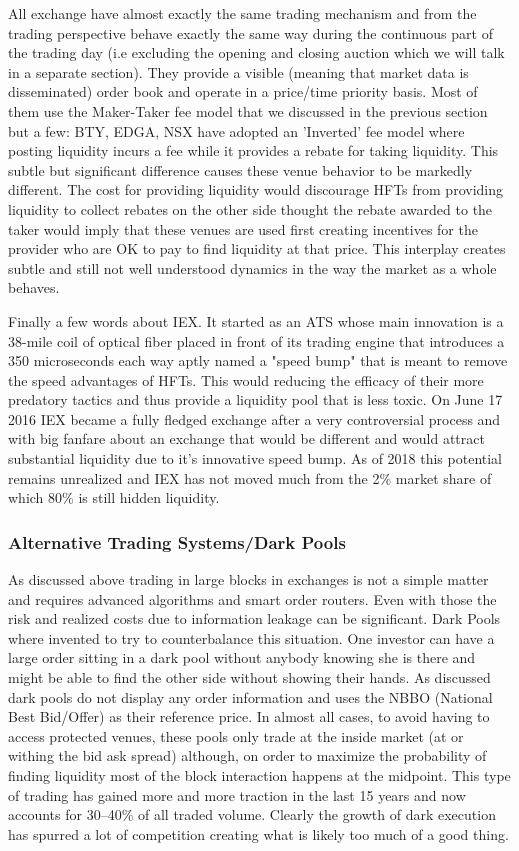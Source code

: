 All exchange have almost exactly the same trading mechanism and from the trading perspective behave exactly the same way during the continuous part of the trading day (i.e excluding the opening and closing auction which we will talk in a separate section). They provide a visible (meaning that market data is disseminated) order book and operate in a price/time priority basis. Most of them use the Maker-Taker fee model that we discussed in the previous section but a few: BTY, EDGA, NSX  have adopted an 'Inverted' fee model where posting liquidity incurs a fee while it provides a rebate for taking liquidity. This subtle but significant difference causes these venue behavior to be markedly different. The cost for providing liquidity would discourage HFTs from providing liquidity to collect rebates on the other side thought the rebate awarded to the taker would imply that these venues are used first creating incentives for the provider who are OK to pay to find liquidity at that price. This interplay creates subtle and still not well understood dynamics in the way the market as a whole behaves.

Finally a few words about IEX. It started as an ATS whose main innovation is a 38-mile coil of optical fiber placed in front of its trading engine that introduces a 350 microseconds each way aptly named a "speed bump" that is meant to  remove the speed advantages of HFTs. This would reducing the efficacy of their more predatory tactics and thus provide a liquidity pool that is less toxic. On June 17 2016 IEX became a fully fledged exchange after a very controversial process and with big fanfare about an exchange that would be different and would attract substantial liquidity due to it's innovative speed bump. As of 2018 this potential remains unrealized and IEX has not moved much from the 2\% market share of which 80\% is still hidden liquidity.

\subsubsection{Alternative Trading Systems/Dark Pools}

As discussed above trading in large blocks in exchanges is not a simple matter and requires advanced algorithms and smart order routers. Even with those the risk and realized costs due to information leakage can be significant. Dark Pools where invented to try to counterbalance this situation. One investor can have a large order sitting in a dark pool without anybody knowing she is there and might be able to find the other side without showing their hands. As discussed dark pools do not display any order information and uses the NBBO (National Best Bid/Offer) as their reference price. In almost all cases, to avoid having to access protected venues, these pools only trade at the inside market (at or withing the bid ask spread) although, on order to maximize the probability of finding liquidity most of the block interaction happens at the midpoint. This type of trading has gained more and more traction in the last 15 years and now accounts for 30--40\% of all traded volume. Clearly the growth of dark execution has spurred a lot of competition creating what is likely too much of a good thing. 

